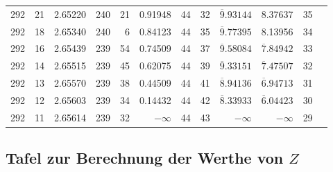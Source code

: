 \documentclass[12pt,a4paper]{article}
\begin{document}
\begin{small}
\begin{longtable}{@{}rrr|rrr|rrr|rrr@{}}
292 & 21 & 2.65220 & 240 & 21 & 0.91948 & 44 & 32 & $\overline{9}.93144$ & 8.37637 & 35 \\
292 & 18 & 2.65340 & 240 & 6 & 0.84123 & 44 & 35 & $\overline{9}.77395$ & 8.13956 & 34 \\
292 & 16 & 2.65439 & 239 & 54 & 0.74509 & 44 & 37 & $\overline{9}.58084$ & $\overline{7}.84942$ & 33 \\
292 & 14 & 2.65515 & 239 & 45 & 0.62075 & 44 & 39 & $\overline{9}.33151$ & $\overline{7}.47507$ & 32 \\
292 & 13 & 2.65570 & 239 & 38 & 0.44509 & 44 & 41 & $\overline{8}.94136$ & $\overline{6}.94713$ & 31 \\
292 & 12 & 2.65603 & 239 & 34 & 0.14432 & 44 & 42 & $\overline{8}.33933$ & $\overline{6}.04423$ & 30 \\
292 & 11 & 2.65614 & 239 & 32 & $-\infty$ & 44 & 43 & $-\infty$ & $-\infty$ & 29 \\
\end{longtable}
\end{small}

\newpage

\subsection*{Tafel zur Berechnung der Werthe von $Z$}
\end{document}
